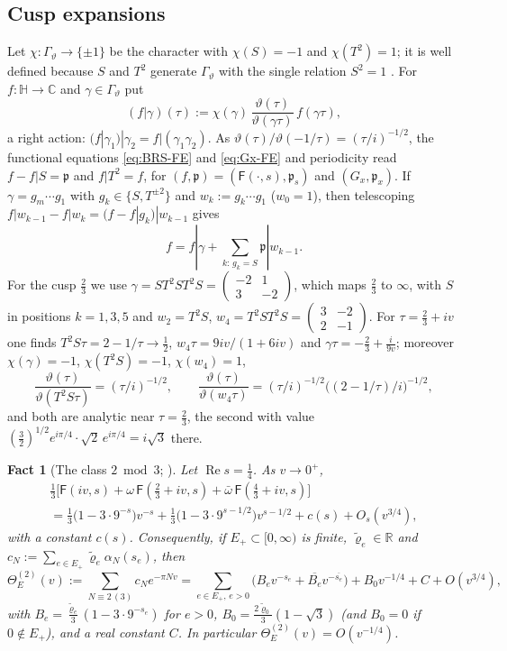 \documentclass[11pt]{amsart}
\newcommand{\RR}{\mathbb R}
\newcommand{\CC}{\mathbb C}
\renewcommand{\Re}{\operatorname{Re}}
\newcommand{\uqpmat}[4]{\left(\begin{smallmatrix}#1&#2\\#3&#4\end{smallmatrix}\right)}
\newtheorem{fact}[theorem]{Fact}
\theoremstyle{definition}
\theoremstyle{remark}
\numberwithin{equation}{section}
\begin{document}
\subsection{Cusp expansions}\label{ssec:cusp}\label{app:cusp}
Let $\chi:\Gamma_\vartheta\to\{\pm1\}$ be the character with $\chi(S)=-1$ and $\chi(T^2)=1$; it is well defined because $S$ and $T^2$ generate
$\Gamma_\vartheta$ with the single relation $S^2=1$ \cite[\S3.1]{BRS}. For $f:\mathbb H\to\CC$ and $\gamma\in\Gamma_\vartheta$ put
\[
(f|\gamma)(\tau):=\chi(\gamma)\,\frac{\vartheta(\tau)}{\vartheta(\gamma\tau)}\,f(\gamma\tau),
\]
a right action: $(f|\gamma_1)|\gamma_2=f|(\gamma_1\gamma_2)$. As $\vartheta(\tau)/\vartheta(-1/\tau)=(\tau/i)^{-1/2}$, the functional equations
\eqref{eq:BRS-FE} and \eqref{eq:Gx-FE} and periodicity read $f-f|S=\mathfrak p$ and $f|T^2=f$, for $(f,\mathfrak p)=(\mathsf F(\cdot,s),\mathfrak p_s)$ and
$(G_x,\mathfrak p_x)$. If $\gamma=g_m\cdots g_1$ with $g_k\in\{S,T^{\pm2}\}$ and $w_k:=g_k\cdots g_1$ ($w_0=1$), then telescoping
$f|w_{k-1}-f|w_k=(f-f|g_k)|w_{k-1}$ gives
\begin{equation}\label{eq:unroll}
f=f|\gamma+\sum_{k:\,g_k=S}\mathfrak p|w_{k-1}.
\end{equation}
For the cusp $\frac23$ we use $\gamma=ST^2ST^2S=\uqpmat{-2}{1}{3}{-2}$, which maps $\frac23$ to $\infty$, with $S$ in positions $k=1,3,5$ and
$w_2=T^2S$, $w_4=T^2ST^2S=\uqpmat{3}{-2}{2}{-1}$. For $\tau=\frac23+iv$ one finds $T^2S\tau=2-1/\tau\to\frac12$, $w_4\tau=9iv/(1+6iv)$ and
$\gamma\tau=-\frac23+\frac i{9v}$; moreover $\chi(\gamma)=-1$, $\chi(T^2S)=-1$, $\chi(w_4)=1$,
\begin{equation}\label{eq:jfactors}
\frac{\vartheta(\tau)}{\vartheta(T^2S\tau)}=(\tau/i)^{-1/2},\qquad
\frac{\vartheta(\tau)}{\vartheta(w_4\tau)}=(\tau/i)^{-1/2}\big((2-1/\tau)/i\big)^{-1/2},
\end{equation}
and both are analytic near $\tau=\frac23$, the second with value $(\frac32)^{1/2}e^{i\pi/4}\cdot\sqrt2\,e^{i\pi/4}=i\sqrt3$ there.

\begin{fact}[The class $2\bmod3$; {\cite[Lemma~B.2]{PaperI}}]\label{lem:cusp-class2}
Let $\Re s=\frac14$. As $v\to0^+$,
\begin{multline*}
\tfrac13\Big[\mathsf F(iv,s)+\omega\,\mathsf F(\tfrac23+iv,s)+\bar\omega\,\mathsf F(\tfrac43+iv,s)\Big]\\
=\tfrac13\big(1-3\cdot9^{-s}\big)v^{-s}+\tfrac13\big(1-3\cdot9^{s-1/2}\big)v^{s-1/2}+c(s)+O_s(v^{3/4}),
\end{multline*}
with a constant $c(s)$. Consequently, if $E_+\subset[0,\infty)$ is finite, $\tilde\varrho_e\in\RR$ and $c_N:=\sum_{e\in E_+}\tilde\varrho_e\alpha_N(s_e)$, then
\[
\Theta_E^{(2)}(v):=\sum_{N\equiv2\,(3)}c_Ne^{-\pi Nv}=\sum_{e\in E_+,\,e>0}\big(B_ev^{-s_e}+\overline{B_e}v^{-\overline{s_e}}\big)+B_0v^{-1/4}+C+O(v^{3/4}),
\]
with $B_e=\frac{\tilde\varrho_e}3(1-3\cdot9^{-s_e})$ for $e>0$, $B_0=\frac{2\tilde\varrho_0}3(1-\sqrt3)$ (and $B_0=0$ if $0\notin E_+$), and a real constant $C$. In
particular $\Theta_E^{(2)}(v)=O(v^{-1/4})$.
\end{fact}
\end{document}
